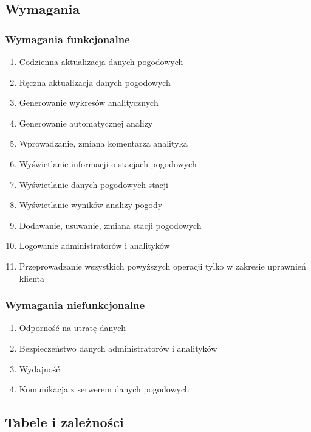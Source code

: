 \documentclass[12pt,a4paper]{article}
\begin{document}
\subsection{Wymagania}
\subsubsection{Wymagania funkcjonalne}
\begin{enumerate}
\item Codzienna aktualizacja danych pogodowych
\item Ręczna aktualizacja danych pogodowych
\item Generowanie wykresów analitycznych
\item Generowanie automatycznej analizy
\item Wprowadzanie, zmiana komentarza analityka
\item Wyświetlanie informacji o stacjach pogodowych
\item Wyświetlanie danych pogodowych stacji
\item Wyświetlanie wyników analizy pogody
\item Dodawanie, usuwanie, zmiana stacji pogodowych
\item Logowanie administratorów i analityków
\item Przeprowadzanie wszystkich powyższych operacji tylko w zakresie uprawnień klienta
\end{enumerate}
\subsubsection{Wymagania niefunkcjonalne}
\begin{enumerate}
\item Odporność na utratę danych
\item Bezpieczeństwo danych administratorów i analityków
\item Wydajność
\item Komunikacja z serwerem danych pogodowych
\end{enumerate}

\subsection{Tabele i zależności}
\end{document}
